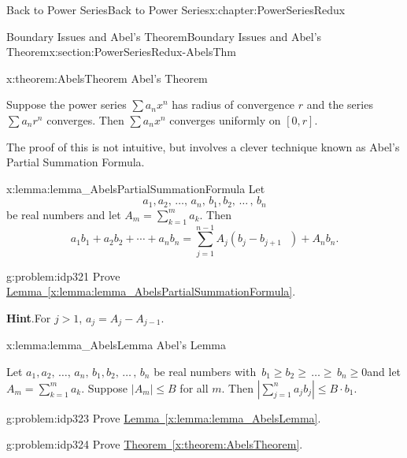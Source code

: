 \begin{chapterptx}{Back to Power Series}{}{Back to Power Series}{}{}{x:chapter:PowerSeriesRedux}
\begin{sectionptx}{Boundary Issues and Abel's Theorem}{}{Boundary Issues and Abel's Theorem}{}{}{x:section:PowerSeriesRedux-AbelsThm}
		\begin{theorem}{}{}{x:theorem:AbelsTheorem}%
			\alert{Abel's Theorem}%
			\par
			 Suppose the power series \(\sum a_nx^n\) has radius of convergence \(r\) and the series \(\sum a_nr^n\) converges. Then \(\sum a_nx^n\) converges uniformly on \([0, r]\).%
		\end{theorem}
		The proof of this is not intuitive, but involves a clever technique known as Abel's Partial Summation Formula.%
		\begin{lemma}{}{}{x:lemma:lemma_AbelsPartialSummationFormula}%
			Let%
			\begin{equation*}
				a_1,a_2,\,\ldots,\,a_n,\,b_1,b_2,\,\ldots\,,\,b_n
			\end{equation*}
			be real numbers and let \(A_m=\sum_{k=1}^ma_k\). Then%
			\begin{equation*}
				a_1b_1+a_2b_2+\cdots+a_nb_n=\sum_{j=1}^{n-1}A_j\left(b_j-b_{j+1}\text{ } \right)+A_nb_n\text{.}
			\end{equation*}
		\end{lemma}
		\begin{problem}{}{g:problem:idp321}%
			Prove \hyperref[x:lemma:lemma_AbelsPartialSummationFormula]{Lemma~{\xreffont\ref{x:lemma:lemma_AbelsPartialSummationFormula}}}.%
			\par\smallskip%
			\noindent\textbf{\blocktitlefont Hint}.\hypertarget{g:hint:idp322}{}\quad{}For \(j>1\), \(a_j=A_j-A_{j-1}\).%
		\end{problem}
		\begin{lemma}{}{}{x:lemma:lemma_AbelsLemma}%
			\alert{Abel's Lemma}%
			\par
			Let \(a_1,a_2,\,\ldots,\,a_n,\,b_1,b_2,\,\ldots\,,\,b_n\) be real numbers with \(\,b_1\geq b_2\geq\,\ldots\geq\,b_n\geq 0\)and let \(A_m=\sum_{k=1}^ma_k\). Suppose \(|A_m|\leq B\) for all \(m\). Then \(|\sum_{j=1}^na_jb_j|\leq B\cdot b_1\).%
		\end{lemma}
		\begin{problem}{}{g:problem:idp323}%
			 Prove \hyperref[x:lemma:lemma_AbelsLemma]{Lemma~{\xreffont\ref{x:lemma:lemma_AbelsLemma}}}.%
		\end{problem}
		\begin{problem}{}{g:problem:idp324}%
			Prove \hyperref[x:theorem:AbelsTheorem]{Theorem~{\xreffont\ref{x:theorem:AbelsTheorem}}}.%
			\par\smallskip%

\end{problem}
\end{sectionptx}
\end{chapterptx}
